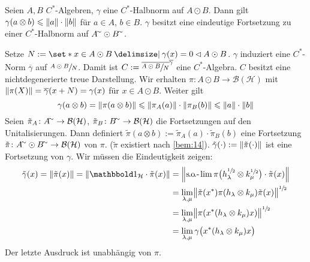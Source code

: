 \begin{korollar}[{name=[{Submultiplikativität bezüglich des Tensorproduktes}]},label=kor:112]
	Seien $A,B$ $C^*$-Algebren, $\gamma$ eine $C^*$-Halbnorm auf $A \odot B$.
	Dann gilt $\gamma(a \otimes b) \le \norm*{a} \cdot \norm*{b}$ für $a \in A$, $b	\in B$.
	$\gamma$ besitzt eine eindeutige Fortsetzung zu einer $C^*$-Halbnorm auf $A^\simm \odot B^\simm$.
\end{korollar}
\begin{beweis}
	Setze $N := \set*{x \in A \odot B \given \gamma(x)=0} \lhd A \odot B$.
	$\gamma$ induziert eine $C^*$-Norm $\overline{\gamma}$ auf $\sfrac{A \odot B}{N}$.
	Damit ist $C := \overline{\sfrac{A \odot B}{N}}^{\overline{\gamma}}$ eine $C^*$-Algebra.
	$C$ besitzt eine nichtdegenerierte treue Darstellung.
	Wir erhalten $\pi \colon A \odot B \to \mathcal{B}(\mathcal{H})$ mit $\norm*{\pi(X)}= \overline{\gamma}(x +N) =\gamma(x)$ für $x \in A \odot B$.
	Weiter gilt
	\[
		\gamma(a \otimes b) = \norm*{\pi(a \otimes b)} \le \norm*{\pi_A(a)} \cdot \norm*{\pi_B(b)} \le \norm*{a} \cdot \norm*{b}
	\]
	Seien $\tilde{\pi}_A \colon A^\simm \to \mathcal{B}(\mathcal{H})$, $\tilde{\pi}_B \colon B^\simm \to \mathcal{B}(\mathcal{H})$ die Fortsetzungen auf den Unitalisierungen.
	Dann definiert $\tilde{\pi}(a \otimes b) := \tilde{\pi}_A(a) \cdot \tilde{\pi}_B(b)$ eine Fortsetzung $\tilde{\pi} \colon A^\simm \odot B^\simm \to \mathcal{B}(\mathcal{H})$ von $\pi$.
	($\tilde{\pi}$ existiert nach \autoref{bem:14}).
	$\tilde{\gamma}(\cdot ) := \norm*{\tilde{\pi}(\cdot)}$ ist eine Fortsetzung von $\gamma$.
	Wir müssen die Eindeutigkeit zeigen:
	\begin{align}
		\tilde{\gamma}(x) = \norm*{\tilde{\pi}(x)} = \norm*{\ind_{\mathcal{H}} \cdot \tilde{\pi}(x)} &= \norm*{\solim \pi\enbrace[\big]{h_\lambda^{\sfrac{1}{2}} \otimes k_\mu^{\sfrac{1}{2}}} \cdot \tilde{\pi}(x)} \\
		&= \lim_{\lambda,\mu} \norm[\big]{\tilde{\pi}(x^*) \pi \enbrace*{h_\lambda \otimes k_\mu} \tilde{\pi}(x)}^{\sfrac{1}{2}} \\
		&= \lim_{\lambda,\mu} \norm[\big]{\pi \enbrace*{x^* (h_\lambda \otimes k_\mu) x}}^{\sfrac{1}{2}} \\
		&= \lim_{\lambda,\mu} \gamma \enbrace[\big]{x^*(h_\lambda \otimes k_\mu)x}
	\end{align}
	Der letzte Ausdruck ist unabhängig von $\pi$.
\end{beweis}

